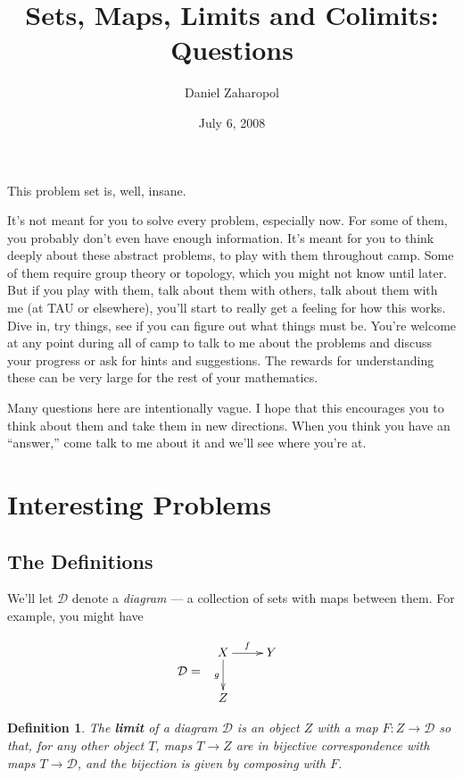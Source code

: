 \documentclass[12pt]{article}
\newtheorem{definition}[theorem]{Definition}
\newcommand{\calD}{\mathcal{D}}
\begin{document}
\title{Sets, Maps, Limits and Colimits: Questions}
\author{Daniel Zaharopol}
\date{July 6, 2008}
\maketitle

This problem set is, well, insane.

It's not meant for you to solve every problem, especially now.  For some of them, you probably don't even have enough information.  It's meant for you to think deeply about these abstract problems, to play with them throughout camp.  Some of them require group theory or topology, which you might not know until later.  But if you play with them, talk about them with others, talk about them with me (at TAU or elsewhere), you'll start to really get a feeling for how this works.  Dive in, try things, see if you can figure out what things must be.  You're welcome at any point during all of camp to talk to me about the problems and discuss your progress or ask for hints and suggestions.  The rewards for understanding these can be very large for the rest of your mathematics.

Many questions here are intentionally vague.  I hope that this encourages you to think about them and take them in new directions.  When you think you have an ``answer,'' come talk to me about it and we'll see where you're at.


\section*{Interesting Problems}

\subsection*{The Definitions}

We'll let $\calD$ denote a \textit{diagram} --- a collection of sets with maps between them.  For example, you might have

$$
\calD = \begin{array}{c} {\xymatrix{ X\ar[r]^f\ar[d]_g & Y \\ Z & }} \end{array}
$$

\begin{definition}
The \textbf{limit} of a diagram $\calD$ is an object $Z$ with a map $F: Z \rightarrow \calD$ so that, for any other object $T$, maps $T \rightarrow Z$ are in bijective correspondence with maps $T \rightarrow \calD$, and the bijection is given by composing with $F$.
\end{definition}
\end{document}
